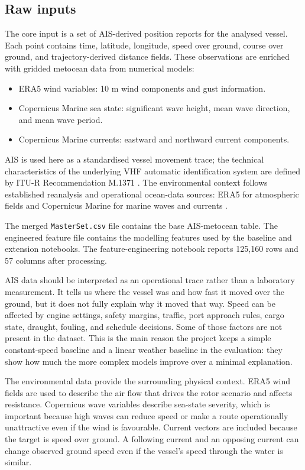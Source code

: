 \documentclass[10pt,a4paper]{article}
\begin{document}
\subsection{Raw inputs}

The core input is a set of AIS-derived position reports for the analysed vessel.
Each point contains time, latitude, longitude, speed over ground, course over
ground, and trajectory-derived distance fields. These observations are enriched
with gridded metocean data from numerical models:

\begin{itemize}
    \item ERA5 wind variables: 10 m wind components and gust information.
    \item Copernicus Marine sea state: significant wave height, mean wave
    direction, and mean wave period.
    \item Copernicus Marine currents: eastward and northward current components.
\end{itemize}

AIS is used here as a standardised vessel movement trace; the technical
characteristics of the underlying VHF automatic identification system are
defined by ITU-R Recommendation M.1371 \cite{itu2026ais}. The environmental
context follows established reanalysis and operational ocean-data sources:
ERA5 for atmospheric fields \cite{hersbach2020era5} and Copernicus Marine for
marine waves and currents \cite{copernicusmarine}.

The merged \texttt{MasterSet.csv} file contains the base AIS-metocean table.
The engineered feature file contains the modelling
features used by the baseline and extension notebooks. The feature-engineering
notebook reports 125,160 rows and 57 columns after processing.

AIS data should be interpreted as an operational trace rather than a laboratory
measurement. It tells us where the vessel was and how fast it moved over the
ground, but it does not fully explain why it moved that way. Speed can be
affected by engine settings, safety margins, traffic, port approach rules,
cargo state, draught, fouling, and schedule decisions. Some of those factors are
not present in the dataset. This is the main reason the project keeps a simple
constant-speed baseline and a linear weather baseline in the evaluation: they
show how much the more complex models improve over a minimal explanation.

The environmental data provide the surrounding physical context. ERA5 wind
fields are used to describe the air flow that drives the rotor scenario and
affects resistance. Copernicus wave variables describe sea-state severity, which
is important because high waves can reduce speed or make a route operationally
unattractive even if the wind is favourable. Current vectors are included
because the target is speed over ground. A following current and an opposing
current can change observed ground speed even if the vessel's speed through the
water is similar.
\end{document}
